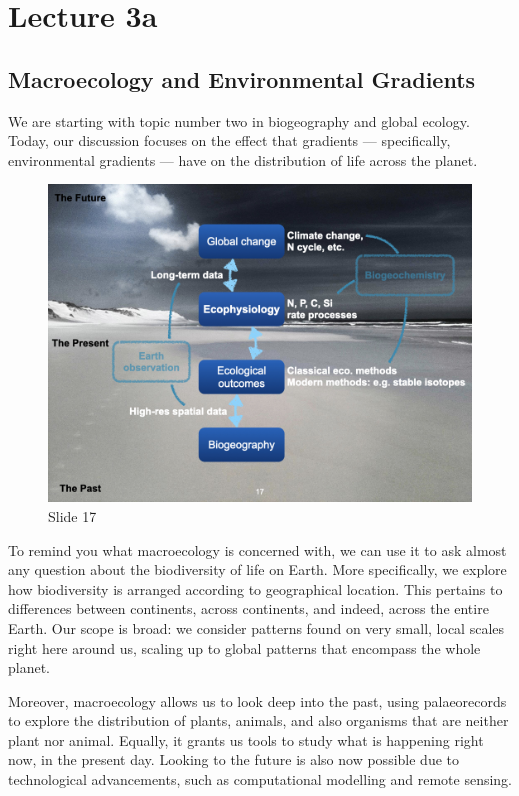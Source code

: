 \documentclass[
  12pt,
]{book}
\begin{document}
\chapter*{Lecture 3a}\label{lecture-3a}

\section{Macroecology and Environmental
Gradients}\label{macroecology-and-environmental-gradients}

We are starting with topic number two in biogeography and global
ecology. Today, our discussion focuses on the effect that gradients ---
specifically, environmental gradients --- have on the distribution of
life across the planet.

\begin{figure}[ht]
\centering
\includegraphics[width=0.8\linewidth]{../images/BDC334/BDC334-017.jpeg}
\caption*{Slide 17}
\end{figure}

To remind you what macroecology is concerned with, we can use it to ask
almost any question about the biodiversity of life on Earth. More
specifically, we explore how biodiversity is arranged according to
geographical location. This pertains to differences between continents,
across continents, and indeed, across the entire Earth. Our scope is
broad: we consider patterns found on very small, local scales right here
around us, scaling up to global patterns that encompass the whole
planet.

Moreover, macroecology allows us to look deep into the past, using
palaeorecords to explore the distribution of plants, animals, and also
organisms that are neither plant nor animal. Equally, it grants us tools
to study what is happening right now, in the present day. Looking to the
future is also now possible due to technological advancements, such as
computational modelling and remote sensing.
\end{document}

